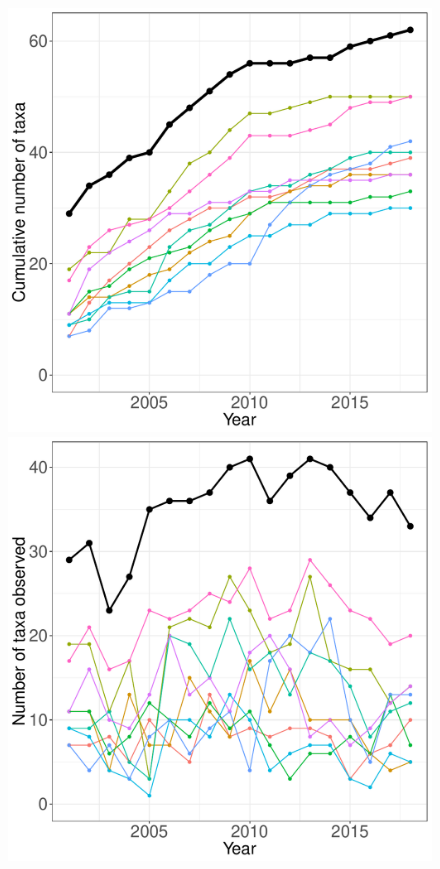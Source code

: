 \documentclass[11pt, oneside]{article}
\begin{document}
\begin{figure}[h!]
\centering
\includegraphics[scale = 0.4]{sbc-fish-castorani_species_accumulation_curve.pdf}
\includegraphics[scale = 0.4]{sbc-fish-castorani_num_taxa_over_time.pdf}

\end{figure}
\end{document}
